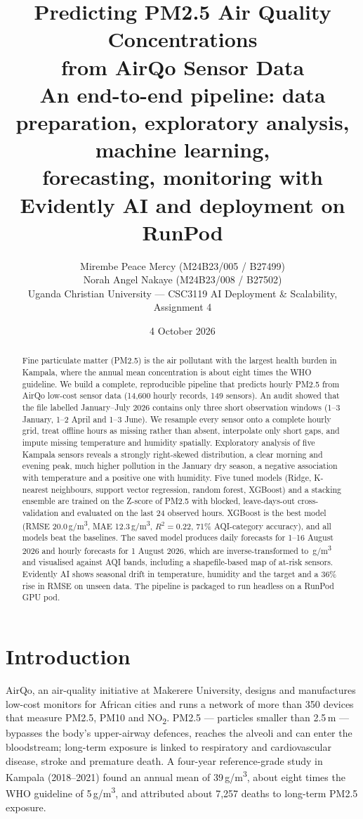 \documentclass[11pt,a4paper]{article}
\title{\vspace{-1.2cm}\textcolor{ucunavy}{\textbf{Predicting PM2.5 Air Quality Concentrations\\from AirQo Sensor Data}}\\[0.4em]
\large An end-to-end pipeline: data preparation, exploratory analysis, machine learning,\\ forecasting, monitoring with Evidently AI and deployment on RunPod}
\author{Mirembe Peace Mercy (M24B23/005 / B27499)\\
Norah Angel Nakaye (M24B23/008 / B27502)\\[0.3em]
\small Uganda Christian University --- CSC3119 AI Deployment \& Scalability, Assignment 4}
\date{4 October 2026}
\newcommand{\ugm}{\,\textmu g/m\textsuperscript{3}}
\begin{document}
\maketitle
\thispagestyle{empty}

\begin{abstract}
\noindent
Fine particulate matter (PM2.5) is the air pollutant with the largest health burden in Kampala, where the annual mean concentration is about eight times the WHO guideline. We build a complete, reproducible pipeline that predicts hourly PM2.5 from AirQo low-cost sensor data (14{,}600 hourly records, 149 sensors). An audit showed that the file labelled January--July 2026 contains only three short observation windows (1--3 January, 1--2 April and 1--3 June). We resample every sensor onto a complete hourly grid, treat offline hours as missing rather than absent, interpolate only short gaps, and impute missing temperature and humidity spatially. Exploratory analysis of five Kampala sensors reveals a strongly right-skewed distribution, a clear morning and evening peak, much higher pollution in the January dry season, a negative association with temperature and a positive one with humidity. Five tuned models (Ridge, K-nearest neighbours, support vector regression, random forest, XGBoost) and a stacking ensemble are trained on the Z-score of PM2.5 with blocked, leave-days-out cross-validation and evaluated on the last 24 observed hours. XGBoost is the best model (RMSE 20.0\ugm, MAE 12.3\ugm, $R^2=0.22$, 71\% AQI-category accuracy), and all models beat the baselines. The saved model produces daily forecasts for 1--16 August 2026 and hourly forecasts for 1 August 2026, which are inverse-transformed to \ugm{} and visualised against AQI bands, including a shapefile-based map of at-risk sensors. Evidently AI shows seasonal drift in temperature, humidity and the target and a 36\% rise in RMSE on unseen data. The pipeline is packaged to run headless on a RunPod GPU pod.
\end{abstract}

\tableofcontents
\newpage

\section{Introduction}
AirQo, an air-quality initiative at Makerere University, designs and manufactures low-cost monitors for African cities and runs a network of more than 350 devices that measure PM2.5, PM10 and NO\textsubscript{2}. PM2.5 --- particles smaller than 2.5\,\textmu m --- bypasses the body's upper-airway defences, reaches the alveoli and can enter the bloodstream; long-term exposure is linked to respiratory and cardiovascular disease, stroke and premature death. A four-year reference-grade study in Kampala (2018--2021) found an annual mean of 39\ugm{}, about eight times the WHO guideline of 5\ugm{}, and attributed about 7{,}257 deaths to long-term PM2.5 exposure.
\end{document}
